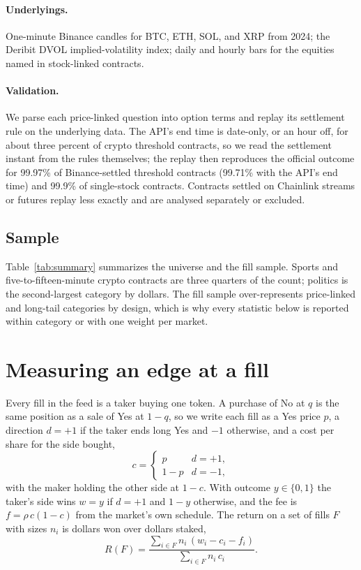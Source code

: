 \documentclass[format=acmsmall, review=false]{acmart}
\begin{document}
\paragraph{Underlyings.} One-minute Binance candles for BTC, ETH, SOL, and XRP from 2024; the Deribit DVOL implied-volatility index; daily and hourly bars for the equities named in stock-linked contracts.

\paragraph{Validation.} We parse each price-linked question into option terms and replay its settlement rule on the underlying data. The API's end time is date-only, or an hour off, for about three percent of crypto threshold contracts, so we read the settlement instant from the rules themselves; the replay then reproduces the official outcome for 99.97\% of Binance-settled threshold contracts (99.71\% with the API's end time) and 99.9\% of single-stock contracts. Contracts settled on Chainlink streams or futures replay less exactly and are analysed separately or excluded.

\subsection{Sample}

Table~\ref{tab:summary} summarizes the universe and the fill sample. Sports and five-to-fifteen-minute crypto contracts are three quarters of the count; politics is the second-largest category by dollars. The fill sample over-represents price-linked and long-tail categories by design, which is why every statistic below is reported within category or with one weight per market.



\section{Measuring an edge at a fill}\label{sec:method}

Every fill in the feed is a taker buying one token. A purchase of No at $q$ is the same position as a sale of Yes at $1-q$, so we write each fill as a Yes price $p$, a direction $d=+1$ if the taker ends long Yes and $-1$ otherwise, and a cost per share for the side bought,
\begin{equation}\label{eq:cost}
c = \begin{cases} p & d=+1,\\ 1-p & d=-1,\end{cases}
\end{equation}
with the maker holding the other side at $1-c$. With outcome $y\in\{0,1\}$ the taker's side wins $w=y$ if $d=+1$ and $1-y$ otherwise, and the fee is $f=\rho\,c(1-c)$ from the market's own schedule. The return on a set of fills $F$ with sizes $n_i$ is dollars won over dollars staked,
\begin{equation}\label{eq:return}
R(F)=\frac{\sum_{i\in F} n_i\,(w_i-c_i-f_i)}{\sum_{i\in F} n_i\,c_i}.
\end{equation}
\end{document}
